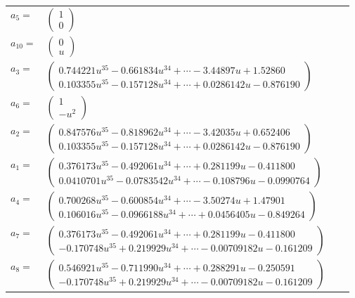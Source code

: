\documentclass[1p]{elsarticle_modified}
\theoremstyle{definition}
\begin{document}
\begin{tabular}{m{7pt} m{180pt} m{7pt} m{180pt} }
\flushright $a_{5}=$&$\begin{pmatrix}1\\0\end{pmatrix}$ \\
\flushright $a_{10}=$&$\begin{pmatrix}0\\u\end{pmatrix}$ \\
\flushright $a_{3}=$&$\begin{pmatrix}0.744221 u^{35}-0.661834 u^{34}+\cdots-3.44897 u+1.52860\\0.103355 u^{35}-0.157128 u^{34}+\cdots+0.0286142 u-0.876190\end{pmatrix}$ \\
\flushright $a_{6}=$&$\begin{pmatrix}1\\- u^2\end{pmatrix}$ \\
\flushright $a_{2}=$&$\begin{pmatrix}0.847576 u^{35}-0.818962 u^{34}+\cdots-3.42035 u+0.652406\\0.103355 u^{35}-0.157128 u^{34}+\cdots+0.0286142 u-0.876190\end{pmatrix}$ \\
\flushright $a_{1}=$&$\begin{pmatrix}0.376173 u^{35}-0.492061 u^{34}+\cdots+0.281199 u-0.411800\\0.0410701 u^{35}-0.0783542 u^{34}+\cdots-0.108796 u-0.0990764\end{pmatrix}$ \\
\flushright $a_{4}=$&$\begin{pmatrix}0.700268 u^{35}-0.600854 u^{34}+\cdots-3.50274 u+1.47901\\0.106016 u^{35}-0.0966188 u^{34}+\cdots+0.0456405 u-0.849264\end{pmatrix}$ \\
\flushright $a_{7}=$&$\begin{pmatrix}0.376173 u^{35}-0.492061 u^{34}+\cdots+0.281199 u-0.411800\\-0.170748 u^{35}+0.219929 u^{34}+\cdots-0.00709182 u-0.161209\end{pmatrix}$ \\
\flushright $a_{8}=$&$\begin{pmatrix}0.546921 u^{35}-0.711990 u^{34}+\cdots+0.288291 u-0.250591\\-0.170748 u^{35}+0.219929 u^{34}+\cdots-0.00709182 u-0.161209\end{pmatrix}$ \\

\end{tabular}
\end{document}

